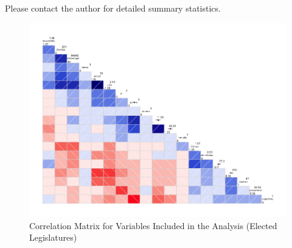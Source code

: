 \documentclass[a4paper]{article}\usepackage{graphicx, color}
\begin{document}
{{\begin{table}[!h]
\begin{center}
\begin{tabular}{l m{7cm} m{3.5cm}}
    \end{tabular}
    \end{center}
    \begin{singlespace}
        Please contact the author for detailed summary statistics.
    \end{singlespace}
\end{table}  

\begin{landscape}
\begin{figure}[t]
    \caption{Correlation Matrix for Variables Included in the Analysis (Elected Legislatures)}
    \label{corrmatrix}
    \begin{center}
    
    \includegraphics[width = \textwidth]{figure/corScatter.png}  






\end{center}
\end{figure}
\end{landscape}}}
\end{document}
